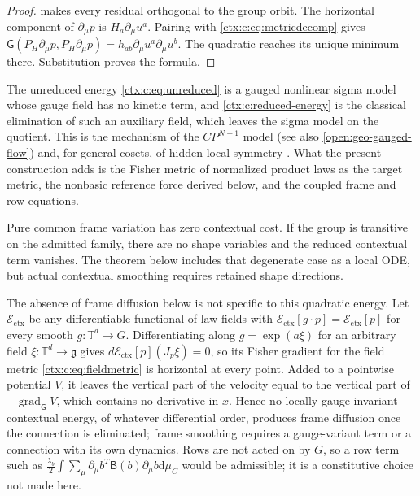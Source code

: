 \begin{proof}
 makes every residual orthogonal to the group orbit. The horizontal component of $\partial_\mu p$ is $H_a\partial_\mu u^a$. Pairing with \cref{ctx:c:eq:metricdecomp} gives
$\mathsf G(P_H\partial_\mu p,P_H\partial_\mu p)
=h_{ab}\partial_\mu u^a\partial_\mu u^b$.
The quadratic reaches its unique minimum there. Substitution proves the formula.
\end{proof}

The unreduced energy \cref{ctx:c:eq:unreduced} is a gauged nonlinear sigma model whose gauge field has no kinetic term, and \cref{ctx:c:reduced-energy} is the classical elimination of such an auxiliary field, which leaves the sigma model on the quotient. This is the mechanism of the $CP^{N-1}$ model \cite{DAddaLuscherDiVecchia1978} (see also \cref{open:geo-gauged-flow}) and, for general cosets, of hidden local symmetry \cite{BandoKugoYamawaki1988}. What the present construction adds is the Fisher metric of normalized product laws as the target metric, the nonbasic reference force derived below, and the coupled frame and row equations.

Pure common frame variation has zero contextual cost. If the group is transitive on the admitted family, there are no shape variables and the reduced contextual term vanishes. The theorem below includes that degenerate case as a local ODE, but actual contextual smoothing requires retained shape directions.

The absence of frame diffusion below is not specific to this quadratic energy. Let $\mathcal E_{\mathrm{ctx}}$ be any differentiable functional of law fields with $\mathcal E_{\mathrm{ctx}}[g\cdot p]=\mathcal E_{\mathrm{ctx}}[p]$ for every smooth $g:\mathbb T^d\to G$. Differentiating along $g=\exp(a\xi)$ for an arbitrary field $\xi:\mathbb T^d\to\mathfrak g$ gives $d\mathcal E_{\mathrm{ctx}}[p](J_p\xi)=0$, so its Fisher gradient for the field metric \cref{ctx:c:eq:fieldmetric} is horizontal at every point. Added to a pointwise potential $V$, it leaves the vertical part of the velocity equal to the vertical part of $-\operatorname{grad}_{\mathsf G}V$, which contains no derivative in $x$. Hence no locally gauge-invariant contextual energy, of whatever differential order, produces frame diffusion once the connection is eliminated; frame smoothing requires a gauge-variant term or a connection with its own dynamics. Rows are not acted on by $G$, so a row term such as $\frac{\lambda_b}2\int\sum_\mu\partial_\mu b^T\mathsf B(b)\partial_\mu b\mathrm d\mu_C$ would be admissible; it is a constitutive choice not made here.

